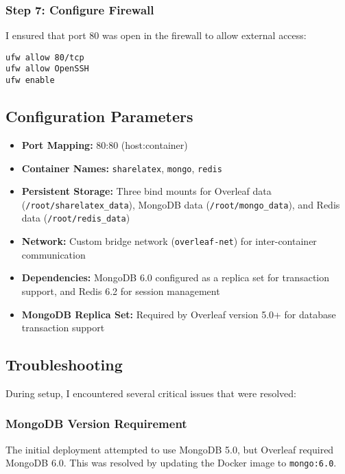 \subsubsection{Step 7: Configure Firewall}
I ensured that port 80 was open in the firewall to allow external access:
\begin{verbatim}
ufw allow 80/tcp
ufw allow OpenSSH
ufw enable
\end{verbatim}

\subsection{Configuration Parameters}
\begin{itemize}
    \item \textbf{Port Mapping:} 80:80 (host:container)
    \item \textbf{Container Names:} \texttt{sharelatex}, \texttt{mongo}, \texttt{redis}
    \item \textbf{Persistent Storage:} Three bind mounts for Overleaf data (\texttt{/root/sharelatex\_data}), MongoDB data (\texttt{/root/mongo\_data}), and Redis data (\texttt{/root/redis\_data})
    \item \textbf{Network:} Custom bridge network (\texttt{overleaf-net}) for inter-container communication
    \item \textbf{Dependencies:} MongoDB 6.0 configured as a replica set for transaction support, and Redis 6.2 for session management
    \item \textbf{MongoDB Replica Set:} Required by Overleaf version 5.0+ for database transaction support
\end{itemize}

\subsection{Troubleshooting}
During setup, I encountered several critical issues that were resolved:

\subsubsection{MongoDB Version Requirement}
The initial deployment attempted to use MongoDB 5.0, but Overleaf required MongoDB 6.0. This was resolved by updating the Docker image to \texttt{mongo:6.0}.

